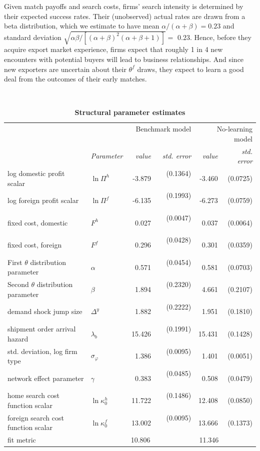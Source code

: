 \documentclass[12pt]{article}
\begin{document}
Given match payoffs and search costs, firms' search intensity is determined
by their expected success rates. Their (unobserved) actual rates are drawn
from a beta distribution, which we estimate to have mean $\alpha /(\alpha
+\beta )=0.23$ and standard deviation $\sqrt{\alpha \beta /\left[ (\alpha
+\beta )^{2}(\alpha +\beta +1)\right] }=$ $0.23$. Hence, before they acquire
export market experience, firms expect that roughly 1 in 4 new encounters
with potential buyers will lead to business relationships. And since new
exporters are uncertain about their $\theta ^{f}$ draws, they expect to
learn a good deal from the outcomes of their early matches.\ \ 

\begin{table}[tbp]
\caption{\textbf{Structural parameter estimates}}
\label{tab:struct_param}\centering
{\small \ }
\par
{\small 
\begin{tabular}{llrrrr}
\hline\hline
&  & \multicolumn{2}{r}{Benchmark model \ \ \ } & \multicolumn{2}{r}{
No-learning model} \\ 
& \textit{Parameter} & \textit{value} & \textit{std. error} & \textit{value}
& \textit{std. error} \\ \cline{2-3}\cline{2-6}
log domestic profit scalar & $\ln \Pi ^{h}$ & -3.879 & (0.1364) \ \  & -3.460
& (0.0725) \\ 
log foreign profit scalar & $\ln \Pi ^{f}$ & -6.135 & (0.1993) \ \  & -6.273
& (0.0759) \\ 
fixed cost, domestic & $F^{h}$ & 0.027 & (0.0047) \ \  & 0.037 & (0.0064) \\ 
fixed cost, foreign & $F^{f}$ & 0.296 & (0.0428) \ \  & 0.301 & (0.0359) \\ 
First $\theta $ distribution parameter & $\alpha $ & 0.571 & (0.0454) \ \  & 
0.581 & (0.0703) \\ 
Second $\theta $ distribution parameter & $\beta $ & 1.894 & (0.2320) \ \  & 
4.661 & (0.2107) \\ 
demand shock jump size & $\Delta ^{y}$ & 1.882 & (0.2222) \ \  & 1.951 & 
(0.1810) \\ 
shipment order arrival hazard & $\lambda _{b}$ & 15.426 & (0.1991) \ \  & 
15.431 & (0.1428) \\ 
std. deviation, log firm type & $\sigma _{\varphi }$ & 1.386 & (0.0095) \ \ 
& 1.401 & (0.0051) \\ 
network effect parameter & $\gamma $ & 0.383 & (0.0485) \ \  & 0.508 & 
(0.0479) \\ 
home search cost function scalar & $\ln \kappa _{0}^{h}$ & 11.722 & (0.1486)
\ \  & 12.408 & (0.0850) \\ 
foreign search cost function scalar & $\ln \kappa _{0}^{f}$ & 13.002 & 
(0.0095) \ \  & 13.666 & (0.1373) \\ \cline{3-6}
fit metric &  & \multicolumn{2}{r}{10.806 \ \ \ \ \ \ \ \ \ \ \ } & 
\multicolumn{2}{r}{11.346 \ \ \ \ \ \ \ \ \ } \\ \hline
\end{tabular}
}
\end{table}
\end{document}
